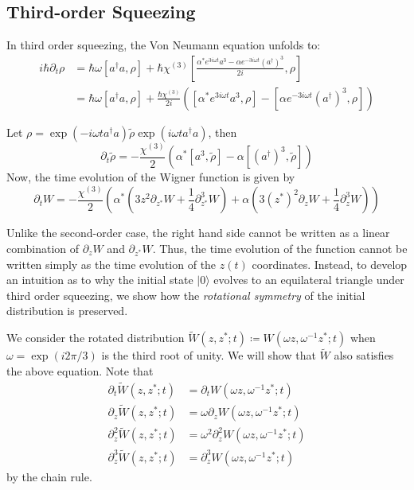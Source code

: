 \documentclass[10pt,a4paper]{report}
\newcommand*{\wigner}{
W(\omega z, \omega^{-1}z^{*};t)}
\newcommand*\ket[1]{|{#1}\rangle}
\begin{document}
\subsection{Third-order Squeezing}
In third order squeezing, the Von Neumann equation unfolds to:
\begin{align*}
  i\hbar\partial_{t}\rho & = \hbar\omega[a^{\dag}a, \rho]+\hbar\chi^{(3)}\left[\frac{\alpha^{*}e^{3i\omega t}a^{3}-\alpha e^{-3i\omega t}(a^{\dag})^{3}}{2i}, \rho\right] \\
                         & = \hbar\omega[a^{\dag}a, \rho]+\frac{\hbar\chi^{(3)}}{2i}([\alpha^{*}e^{3i\omega t}a^{3}, \rho]-[\alpha e^{-3i\omega t}(a^{\dag})^{3}, \rho])
\end{align*}

Let $\rho=\exp(-i\omega ta^{\dag}a)\tilde{\rho}\exp(i\omega ta^{\dag}a)$, then
\[\partial_{t}\tilde{\rho}=-\frac{\chi^{(3)}}{2}(\alpha^{*}[a^{3},\tilde{\rho}]-\alpha[(a^{\dag})^{3},\tilde{\rho}])\]
Now, the time evolution of the Wigner function is given by
\begin{equation}
  \partial_{t}W=-\frac{\chi^{(3)}}{2}\left(\alpha^{*}\left(3z^{2}\partial_{z^{*}}W+\frac{1}{4}\partial_{z^{*}}^{3}W\right)+\alpha\left(3(z^{*})^{2}\partial_{z}W+\frac{1}{4}\partial_{z}^{3}W\right)\right)
\end{equation}

Unlike the second-order case, the right hand side cannot be written as a linear combination of $\partial_{z}W$ and $\partial_{z^{*}}W$.
Thus, the time evolution of the function cannot be written simply as the time evolution of the $z(t)$ coordinates.
Instead, to develop an intuition as to why the initial state $\ket{0}$ evolves to an equilateral triangle under third order squeezing, we show how the \textit{rotational symmetry} of the initial distribution is preserved.

We consider the rotated distribution $\tilde{W}(z,z^{*};t)\coloneq W(\omega z, \omega^{-1}z^{*};t)$ when $\omega=\exp(i2\pi/3)$ is the third root of unity.
We will show that $\tilde{W}$ also satisfies the above equation.
Note that
\begin{align}
  \partial_{t}\tilde{W}(z,z^{*};t)     & =\partial_{t}\wigner               \\
  \partial_{z}\tilde{W}(z,z^{*};t)     & =\omega\partial_{z}\wigner         \\
  \partial_{z}^{2}\tilde{W}(z,z^{*};t) & =\omega^{2}\partial_{z}^{2}\wigner \\
  \partial_{z}^{3}\tilde{W}(z,z^{*};t) & =\partial_{z}^{3}\wigner
\end{align}
by the chain rule.
\end{document}
